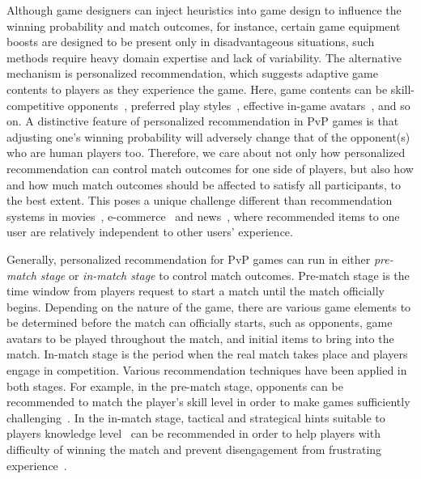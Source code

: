 Although game designers can inject heuristics into game design to influence the winning probability and match outcomes, for instance, certain game equipment boosts are designed to be present only in disadvantageous situations, such methods require heavy domain expertise and lack of variability. The alternative mechanism is personalized recommendation, which suggests adaptive game contents to players as they experience the game. Here, game contents can be skill-competitive opponents~\cite{Delalleau2012,herbrich:trueskill}, preferred play styles~\cite{thue2007interactive,magerko2008intelligent}, effective in-game avatars~\cite{conley2013does}, and so on. A distinctive feature of  personalized recommendation in PvP games is that adjusting one's winning probability will adversely change that of the opponent(s) who are human players too. Therefore, we care about not only how personalized recommendation can control match outcomes for one side of players, but also how and how much match outcomes should be affected to satisfy all participants, to the best extent. This poses a unique challenge different than recommendation systems in movies~\cite{amatriain2012netflix}, e-commerce~\cite{linden2003amazon} and news~\cite{das2007google}, where recommended items to one user are relatively independent to other users' experience.




Generally, personalized recommendation for PvP games can run in either \textit{pre-match stage} or \textit{in-match stage} to control match outcomes. Pre-match stage is the time window from players request to start a match until the match officially begins. Depending on the nature of the game, there are various game elements to be determined before the match can officially starts, such as opponents, game avatars to be played throughout the match, and initial items to bring into the match. In-match stage is the period when the real match takes place and players engage in competition. Various recommendation techniques have been applied in both stages. For example, in the pre-match stage, opponents can be recommended to match the player's skill level in order to make games sufficiently challenging~\cite{sweetser2005gameflow,flow1990psychology,chen2007flow}. In the in-match stage, tactical and strategical hints suitable to players knowledge level~\cite{weber2009data,cunha2014rtsmate} can be recommended in order to help players with difficulty of winning the match and prevent disengagement from frustrating experience~\cite{schoenau2011player}.

